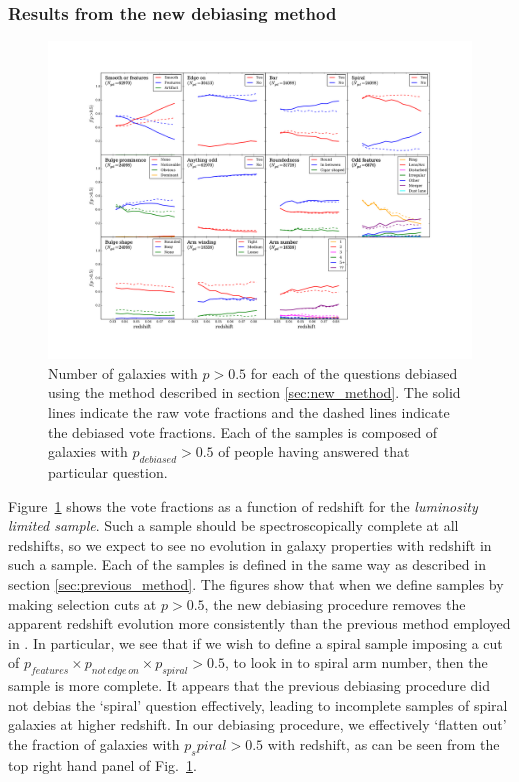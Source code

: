 \documentclass[useAMS,usenatbib]{mn2e}
\begin{document}
\subsubsection{Results from the new debiasing method}

\begin{figure}
		\centering

        \includegraphics[width=1\textwidth]{Bias_imgs/vote_panel_plot_debiased.pdf}

        \caption{Number of galaxies with $p>0.5$ for each of the questions debiased using the method described in section \ref{sec:new_method}. The solid lines indicate the raw vote fractions and the dashed lines indicate the debiased vote fractions. Each of the samples is composed of galaxies with $p_{debiased}>0.5$ of people having answered that particular question.}

        \label{fig:vote_panel_debiased}

\end{figure}

Figure~\ref{fig:vote_panel_debiased} shows the vote fractions as a function of redshift for the \textit{luminosity limited sample}. Such a sample should be spectroscopically complete at all redshifts, so we expect to see no evolution in galaxy properties with redshift in such a sample. Each of the samples is defined in the same way as described in section \ref{sec:previous_method}. The figures show that when we define samples by making selection cuts at $p>0.5$, the new debiasing procedure removes the apparent redshift evolution more consistently than the previous method employed in \citet{Willett_13}. In particular, we see that if we wish to define a spiral sample imposing a cut of $p_{features} \times p_{not \, edge \, on} \times p_{spiral} > 0.5$, to look in to spiral arm number, then the sample is more complete. It appears that the previous debiasing procedure did not debias the `spiral' question effectively, leading to incomplete samples of spiral galaxies at higher redshift. In our debiasing procedure, we effectively `flatten out' the fraction of galaxies with $p_spiral>0.5$ with redshift, as can be seen from the top right hand panel of Fig.~\ref{fig:vote_panel_debiased}.
\end{document}
